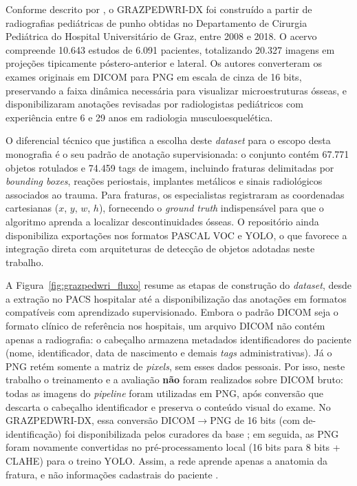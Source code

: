 \documentclass[12pt,oneside,a4paper,chapter=TITLE,section=TITLE,sumario=tradicional]{abntex2}
\begin{document}
Conforme descrito por , o GRAZPEDWRI-DX foi construído a partir de radiografias pediátricas de punho obtidas no Departamento de Cirurgia Pediátrica do Hospital Universitário de Graz, entre 2008 e 2018. O acervo compreende 10.643 estudos de 6.091 pacientes, totalizando 20.327 imagens em projeções tipicamente póstero-anterior e lateral. Os autores converteram os exames originais em DICOM para PNG em escala de cinza de 16 bits, preservando a faixa dinâmica necessária para visualizar microestruturas ósseas, e disponibilizaram anotações revisadas por radiologistas pediátricos com experiência entre 6 e 29 anos em radiologia musculoesquelética.

O diferencial técnico que justifica a escolha deste \textit{dataset} para o escopo desta monografia é o seu padrão de anotação supervisionada: o conjunto contém 67.771 objetos rotulados e 74.459 tags de imagem, incluindo fraturas delimitadas por \textit{bounding boxes}, reações periostais, implantes metálicos e sinais radiológicos associados ao trauma. Para fraturas, os especialistas registraram as coordenadas cartesianas ($x$, $y$, $w$, $h$), fornecendo o \textit{ground truth} indispensável para que o algoritmo aprenda a localizar descontinuidades ósseas. O repositório ainda disponibiliza exportações nos formatos PASCAL VOC e YOLO, o que favorece a integração direta com arquiteturas de detecção de objetos adotadas neste trabalho.

A Figura~\ref{fig:grazpedwri_fluxo} resume as etapas de construção do \textit{dataset}, desde a extração no PACS hospitalar até a disponibilização das anotações em formatos compatíveis com aprendizado supervisionado. Embora o padrão DICOM seja o formato clínico de referência nos hospitais, um arquivo DICOM não contém apenas a radiografia: o cabeçalho armazena metadados identificadores do paciente (nome, identificador, data de nascimento e demais \textit{tags} administrativas). Já o PNG retém somente a matriz de \textit{pixels}, sem esses dados pessoais. Por isso, neste trabalho o treinamento e a avaliação \textbf{não} foram realizados sobre DICOM bruto: todas as imagens do \textit{pipeline} foram utilizadas em PNG, após conversão que descarta o cabeçalho identificador e preserva o conteúdo visual do exame. No GRAZPEDWRI-DX, essa conversão DICOM$\rightarrow$PNG de 16 bits (com de-identificação) foi disponibilizada pelos curadores da base \cite{nagy2022grazpedwri}; em seguida, as PNG foram novamente convertidas no pré-processamento local (16 bits para 8 bits + CLAHE) para o treino YOLO. Assim, a rede aprende apenas a anatomia da fratura, e não informações cadastrais do paciente \cite{dicomstandard2024,nagy2022grazpedwri}.
\end{document}
